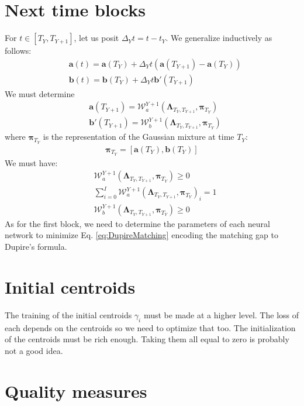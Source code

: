 \documentclass[10pt,a4paper]{article}
\begin{document}
\section{Next time blocks}
For $t\in \left[ T_Y, T_{Y+1}\right]$, let us posit $\Delta_Y t = t - t_Y$. We generalize inductively as follows:
\begin{align}
&\boldsymbol{a}(t) = \boldsymbol{a}(T_Y) + \Delta_Y t (\boldsymbol{a}(T_{Y+1})-\boldsymbol{a}(T_Y)) \\
&\boldsymbol{b}(t) = \boldsymbol{b}(T_Y) + \Delta_Y t \boldsymbol{b}'(T_{Y+1})
\end{align}
We must determine 
\begin{align}
&\boldsymbol{a}(T_{Y+1}) =  \mathcal{W}_a^{Y+1}(\boldsymbol{\Lambda}_{T_Y,T_{Y+1}},\boldsymbol{\pi}_{T_Y}) \\
&\boldsymbol{b}'(T_{Y+1}) =  \mathcal{W}_b^{Y+1}(\boldsymbol{\Lambda}_{T_Y,T_{Y+1}},\boldsymbol{\pi}_{T_Y})
\end{align}
where $\boldsymbol{\pi}_{T_Y}$ is the representation of the Gaussian mixture at time $T_Y$:
\begin{align}
\boldsymbol{\pi}_{T_Y} = \left[\boldsymbol{a}(T_Y),\boldsymbol{b}(T_Y)\right]
\end{align}
We must have:
\begin{align}
&\mathcal{W}_a^{Y+1}(\boldsymbol{\Lambda}_{T_Y,T_{Y+1}},\boldsymbol{\pi}_{T_Y})\geq 0\\
&\sum_{i=0}^I\mathcal{W}_a^{Y+1}(\boldsymbol{\Lambda}_{T_Y,T_{Y+1}},\boldsymbol{\pi}_{T_Y})_i = 1\\
&\mathcal{W}_b^{Y+1}(\boldsymbol{\Lambda}_{T_Y,T_{Y+1}},\boldsymbol{\pi}_{T_Y})\geq 0
\end{align}
As for the first block, we need to determine the parameters of each neural network to minimize Eq. \ref{eq:DupireMatching} encoding the matching gap to Dupire's formula.

\section{Initial centroids}
The training of the initial centroids $\gamma_i$ must be made at a higher level. The loss of each depends on the centroids so we need to optimize that too. The initialization of the centroids must be rich enough. Taking them all equal to zero is probably not a good idea.


\section{Quality measures}
\end{document}
